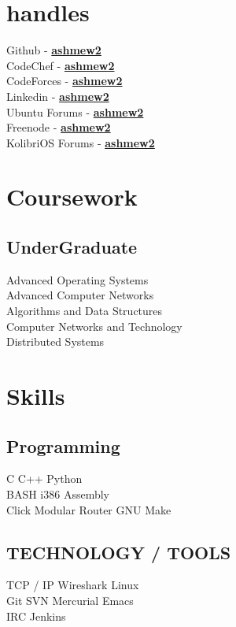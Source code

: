 \documentclass[letterpaper]{deedy-resume} %
\begin{document}
\begin{minipage}[t]{0.33\textwidth}
\section{handles}
Github - \href{https://github.com/ashmew2}{\bf ashmew2} \\
CodeChef - \href{http://www.codechef.com/users/ashmew2}{\bf ashmew2} \\
CodeForces - \href{http://codeforces.com/profile/ashmew2}{\bf ashmew2} \\
Linkedin - \href{in.linkedin.com/in/ashmew2} {\bf ashmew2} \\
Ubuntu Forums - \href{http://ubuntuforums.org/showthread.php?t=821461} {\bf ashmew2} \\
Freenode - \href{http://freenode.org} {\bf ashmew2} \\
KolibriOS Forums - \href{http://board.kolibrios.org/memberlist.php?mode=viewprofile&u=6211} {\bf ashmew2} \\
\sectionspace %
\section{Coursework}
\subsection{UnderGraduate}
Advanced Operating Systems \\
Advanced Computer Networks \\
Algorithms and Data Structures \\
Computer Networks and Technology \\
Distributed Systems \\
\sectionspace %
\section{Skills}
\subsection{Programming}
C \textbullet{} C++ \textbullet{} Python \\
BASH \textbullet{} i386 Assembly \\
Click Modular Router  \textbullet{} GNU Make \\
\sectionspace %
\subsection{TECHNOLOGY / TOOLS}
TCP / IP \textbullet{} Wireshark \textbullet{} Linux \\ 
Git \textbullet{} SVN \textbullet{} Mercurial \textbullet{}  Emacs \\
IRC \textbullet{} Jenkins 
\sectionspace %
\end{minipage} %
\end{document}
